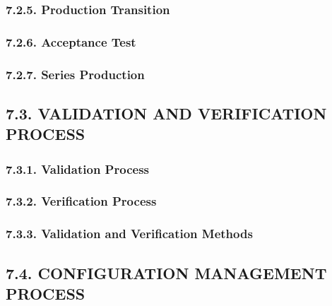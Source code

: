 \documentclass[
]{article}
\begin{document}
\hypertarget{production-transition-1}{%
\subsubsection{7.2.5. Production
Transition}\label{production-transition-1}}

\hypertarget{acceptance-test-1}{%
\subsubsection{7.2.6. Acceptance Test}\label{acceptance-test-1}}

\hypertarget{series-production-1}{%
\subsubsection{7.2.7. Series Production}\label{series-production-1}}

\hypertarget{validation-and-verification-process-1}{%
\subsection{7.3. VALIDATION AND VERIFICATION
PROCESS}\label{validation-and-verification-process-1}}

\hypertarget{validation-process-1}{%
\subsubsection{7.3.1. Validation Process}\label{validation-process-1}}

\hypertarget{verification-process-1}{%
\subsubsection{7.3.2. Verification
Process}\label{verification-process-1}}

\hypertarget{validation-and-verification-methods-1}{%
\subsubsection{7.3.3. Validation and Verification
Methods}\label{validation-and-verification-methods-1}}

\hypertarget{configuration-management-process-1}{%
\subsection{7.4. CONFIGURATION MANAGEMENT
PROCESS}\label{configuration-management-process-1}}
\end{document}
